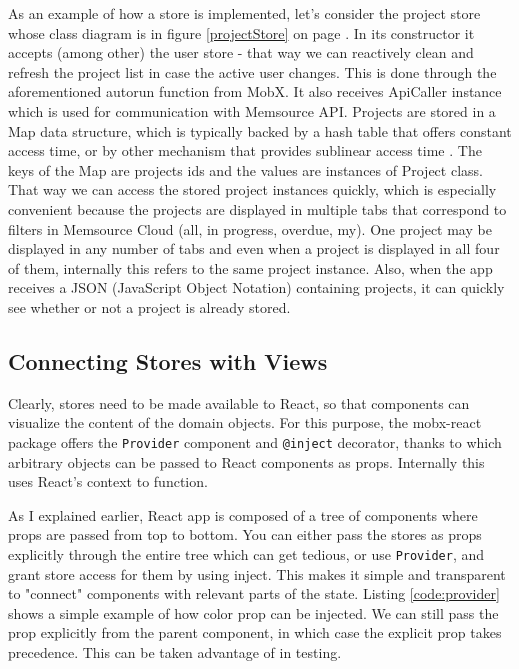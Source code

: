 As an example of how a store is implemented, let's consider the project store whose class diagram is in figure \ref{projectStore} on page \pageref{projectStore}. In its constructor it accepts (among other) the user store - that way we can reactively clean and refresh the project list in case the active user changes. This is done through the aforementioned autorun function from MobX. It also receives ApiCaller instance which is used for communication with Memsource API. Projects are stored in a Map data structure, which is typically backed by a hash table that offers constant access time, or by other mechanism that provides sublinear access time \cite{ecma:map}. The keys of the Map are projects ids and the values are instances of Project class. That way we can access the stored project instances quickly, which is especially convenient because the projects are displayed in multiple tabs that correspond to filters in Memsource Cloud (all, in progress, overdue, my). One project may be displayed in any number of tabs and even when a project is displayed in all four of them, internally this refers to the same project instance. Also, when the app receives a JSON (JavaScript Object Notation) containing projects, it can quickly see whether or not a project is already stored.


\subsection{Connecting Stores with Views}

Clearly, stores need to be made available to React, so that components can visualize the content of the domain objects. For this purpose, the mobx-react package offers the \texttt{Provider} component and \texttt{@inject} decorator, thanks to which arbitrary objects can be passed to React components as props. Internally this uses React's context to function.

As I explained earlier, React app is composed of a tree of components where props are passed from top to bottom. You can either pass the stores as props explicitly through the entire tree which can get tedious, or use \texttt{Provider}, and grant store access for them by using inject. This makes it simple and transparent to "connect" components with relevant parts of the state. Listing \ref{code:provider} shows a simple example of how color prop can be injected. We can still pass the prop explicitly from the parent component, in which case the explicit prop takes precedence. This can be taken advantage of in testing.

